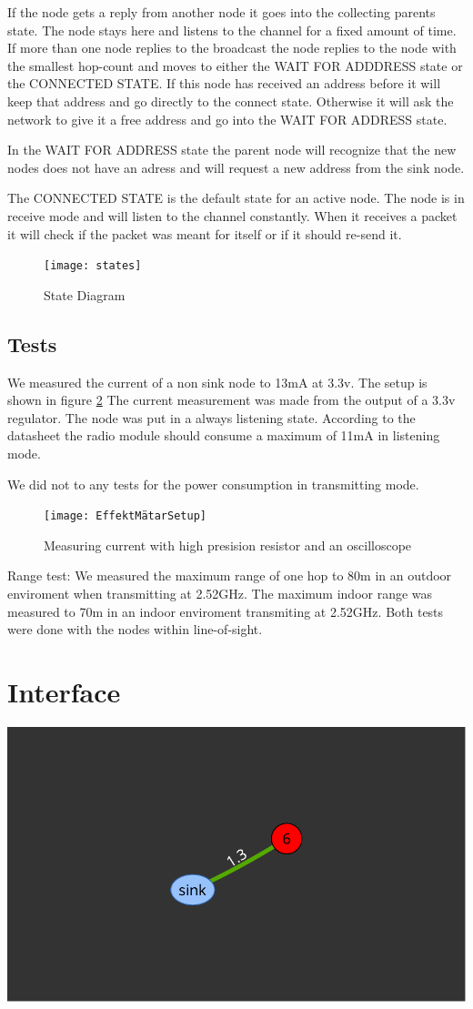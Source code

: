 \documentclass[a4paper,11pt]{article}
\begin{document}
If the node gets a reply from another node it goes into the collecting
parents state. The node stays here and listens to the channel for a
fixed amount of time. If more than one node replies to the broadcast
the node replies to the node with the smallest hop-count and moves to
either the WAIT FOR ADDDRESS state or the CONNECTED STATE. If this
node has received an address before it will keep that address and go
directly to the connect state. Otherwise it will ask the network to
give it a free address and go into the WAIT FOR ADDRESS state.

In the WAIT FOR ADDRESS state the parent node will recognize that the
new nodes does not have an adress and will request a new address from
the sink node. 

The CONNECTED STATE is the default state for an active node. The node
is in receive mode and will listen to the channel constantly. When
it receives a packet it will check if the packet was meant for
itself or if it should re-send it.


\begin{figure}[h!]
  \texttt{[image: states]}
  \caption{State Diagram}
  \label{fig:state}
\end{figure}

\subsection{Tests}
We measured the current of a non sink node to 13mA at 3.3v. The setup
is shown in figure \ref{fig:Effekt} The current measurement was made from
the output of a 3.3v regulator.  The node was put in a always
listening state. According to the datasheet the radio module should
consume a maximum of 11mA in listening mode.

We did not to any tests for the power consumption in transmitting
mode.

\begin{figure}[h!]
  \texttt{[image: EffektMätarSetup]}
  \caption{Measuring current with high presision resistor and an oscilloscope}
  \label{fig:Effekt}
\end{figure}

Range test:
We measured the maximum range of one hop to 80m in an outdoor 
enviroment when transmitting at 2.52GHz. 
The maximum indoor range was measured to 70m in an indoor
enviroment transmiting at 2.52GHz. Both tests were done with the nodes within line-of-sight.
 


\section{Interface}
\begin{center}
\includegraphics[width=.5\textwidth]{map}
\end{center}
\end{document}
